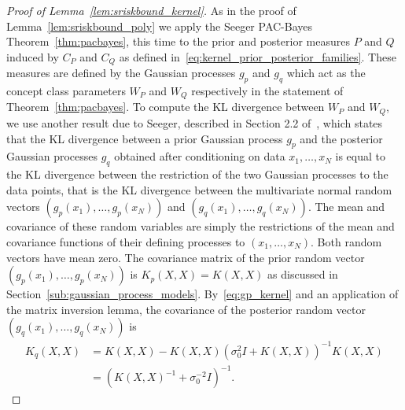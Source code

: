 \documentclass[onefignum,onetabnum]{siamart171218}
\begin{document}
\begin{proof}[Proof of Lemma~\ref{lem:sriskbound_kernel}]
    As in the proof of Lemma~\ref{lem:sriskbound_poly}
    we apply the Seeger PAC-Bayes Theorem~\ref{thm:pacbayes}, 
    this time to the prior and posterior
    measures $P$ and $Q$ induced by $C_{P}$ and $C_{Q}$ as
    defined in~\eqref{eq:kernel_prior_posterior_families}.
    These measures are defined by the Gaussian processes
    $g_p$ and $g_q$ which act as the concept class parameters
    $W_P$ and $W_Q$ respectively in the statement of Theorem~\ref{thm:pacbayes}. 
    To compute the KL divergence between $W_P$ and $W_Q$, we use another result
    due to Seeger, described in Section 2.2 of~\cite{seeger2002pac}, which states that
    the KL divergence between a prior Gaussian process $g_p$ and the posterior
    Gaussian processes $g_q$ obtained after conditioning on data
    $x_1,\dotsc,x_N$ is equal to the KL divergence between the restriction of
    the two Gaussian processes to the data points, that is the KL divergence
    between the multivariate normal random vectors
    $(g_p(x_1),\dotsc,g_p(x_N))$
    and
    $(g_q(x_1),\dotsc,g_q(x_N))$.
    The mean and covariance of these random variables are simply the restrictions
    of the mean and covariance functions of their defining processes to
    $(x_1,\dotsc,x_N)$. Both random vectors have mean zero. The covariance
    matrix of the prior random vector
    $(g_p(x_1),\dotsc,g_p(x_N))$ is $K_p(X,X)=K(X,X)$ as discussed in
    Section~\ref{sub:gaussian_process_models}. By~\eqref{eq:gp_kernel} and an application of the matrix inversion lemma,
    the covariance of the posterior random vector
    $(g_q(x_1),\dotsc,g_q(x_N))$ is
    \begin{equation}
        \begin{aligned}
            K_q(X,X) 
            &= 
            K(X,X) - K(X,X)\left(\sigma_0^2 I + K(X,X)\right)^{-1}K(X,X)\\
            &=
            \left(K(X,X)^{-1} + \sigma_0^{-2} I\right)^{-1}.
        \end{aligned}
    \end{equation} 
\end{proof}
\end{document}
